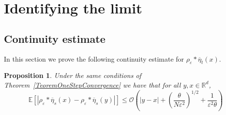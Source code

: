 \documentclass[a4paper,12pt]{article}
\newtheorem{proposition}[theorem]{Proposition}
\newcommand{\EE}{\mathbb{E}}
\newcommand{\1}{{\bf {1}}}
\def\epsilon{\varepsilon}
\begin{document}
\section{Identifying the limit}
\subsection{Continuity estimate}
In this section we prove the following continuity estimate for $\rho_\epsilon * \overline{\eta}_t(x)$.

\begin{proposition} \label{ContinuityEstimate}
Under the same conditions of Theorem~\ref{TeoremOneStepConvergence} we have that for all $y,x \in \mathbb{R}^d$,
\[ \EE[|\rho_\epsilon*\overline{\eta}_s(x) -\rho_\epsilon*\overline{\eta}_s(y)| ] \leq \mathcal{O}\left( |y-x| + \left(\frac{\theta}{N \epsilon^2}\right)^{1/2} + \frac{1}{\epsilon^2 \theta} \right)\]
\end{proposition}
\end{document}
